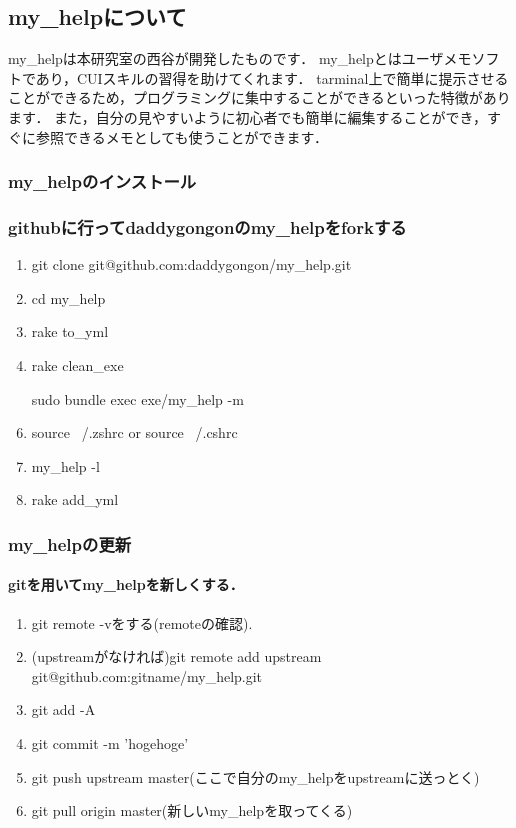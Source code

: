 
\subsection{my\_helpについて}
my\_helpは本研究室の西谷が開発したものです．
my\_helpとはユーザメモソフトであり，CUIスキルの習得を助けてくれます．
tarminal上で簡単に提示させることができるため，プログラミングに集中することができるといった特徴があります．
また，自分の見やすいように初心者でも簡単に編集することができ，すぐに参照できるメモとしても使うことができます．

\subsubsection{my\_helpのインストール}
\subsubsection{githubに行ってdaddygongonのmy\_helpをforkする}
\begin{enumerate}
\item git clone git@github.com:daddygongon/my\_help.git
\item cd my\_help
\item rake to\_yml
\item rake clean\_exe
\item [sudo] bundle exec exe/my\_help -m
\item source ~/.zshrc or source ~/.cshrc
\item my\_help -l
\item rake add\_yml
\end{enumerate}
\subsubsection{my\_helpの更新}
\paragraph{gitを用いてmy\_helpを新しくする．}
\begin{enumerate}
\item git remote -vをする(remoteの確認).
\item (upstreamがなければ)git remote add upstream git@github.com:gitname/my\_help.git
\item git add -A
\item git commit -m 'hogehoge'
\item git push upstream master(ここで自分のmy\_helpをupstreamに送っとく)
\item git pull origin master(新しいmy\_helpを取ってくる)
\end{enumerate}
